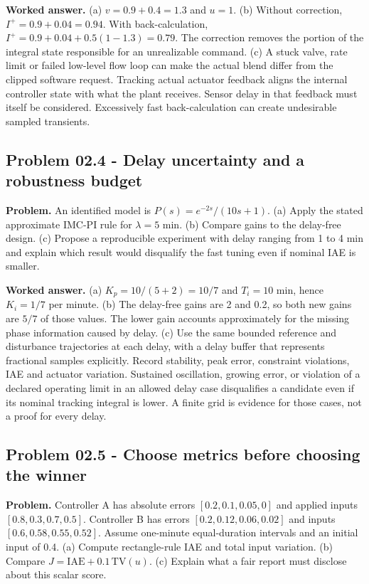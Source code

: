 \documentclass[11pt,a4paper]{article}
\begin{document}
\textbf{Worked answer.} (a) $v=0.9+0.4=1.3$ and $u=1$. (b) Without correction, $I^+=0.9+0.04=0.94$. With back-calculation, $I^+=0.9+0.04+0.5(1-1.3)=0.79$. The correction removes the portion of the integral state responsible for an unrealizable command. (c) A stuck valve, rate limit or failed low-level flow loop can make the actual blend differ from the clipped software request. Tracking actual actuator feedback aligns the internal controller state with what the plant receives. Sensor delay in that feedback must itself be considered. Excessively fast back-calculation can create undesirable sampled transients.

\subsection{Problem 02.4 - Delay uncertainty and a robustness budget}
\textbf{Problem.} An identified model is $P(s)=e^{-2s}/(10s+1)$. (a) Apply the stated approximate IMC-PI rule for $\lambda=5$ min. (b) Compare gains to the delay-free design. (c) Propose a reproducible experiment with delay ranging from 1 to 4 min and explain which result would disqualify the fast tuning even if nominal IAE is smaller.


\textbf{Worked answer.} (a) $K_p=10/(5+2)=10/7$ and $T_i=10$ min, hence $K_i=1/7$ per minute. (b) The delay-free gains are 2 and 0.2, so both new gains are $5/7$ of those values. The lower gain accounts approximately for the missing phase information caused by delay. (c) Use the same bounded reference and disturbance trajectories at each delay, with a delay buffer that represents fractional samples explicitly. Record stability, peak error, constraint violations, IAE and actuator variation. Sustained oscillation, growing error, or violation of a declared operating limit in an allowed delay case disqualifies a candidate even if its nominal tracking integral is lower. A finite grid is evidence for those cases, not a proof for every delay.

\subsection{Problem 02.5 - Choose metrics before choosing the winner}
\textbf{Problem.} Controller A has absolute errors $[0.2,0.1,0.05,0]$ and applied inputs $[0.8,0.3,0.7,0.5]$. Controller B has errors $[0.2,0.12,0.06,0.02]$ and inputs $[0.6,0.58,0.55,0.52]$. Assume one-minute equal-duration intervals and an initial input of 0.4. (a) Compute rectangle-rule IAE and total input variation. (b) Compare $J=\mathrm{IAE}+0.1\,\mathrm{TV}(u)$. (c) Explain what a fair report must disclose about this scalar score.
\end{document}
